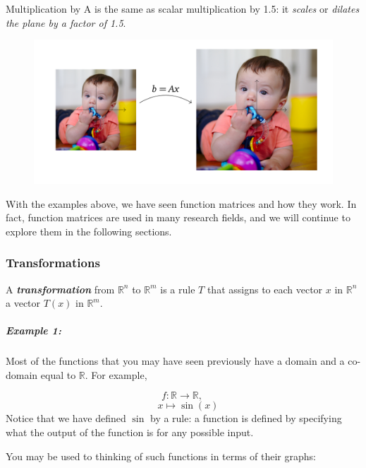 \documentclass[a4paper,12pt]{article}
\begin{document}
Multiplication by A is the same as scalar multiplication by 1.5: it \textit{scales} or \textit{dilates the plane by a factor of 1.5}.
\begin{figure}[H]
    \centering
    \includegraphics[width=1\linewidth]{1.5.png}
    \label{fig:enter-label}
\end{figure}

With the examples above, we have seen function matrices and how they work. In fact, function matrices are used in many research fields, and we will continue to explore them in the following sections. 

\subsubsection{Transformations}

\begin{tcolorbox}[title=Definition,colframe=blue!70!black, colback=blue!5!white]
A \textbf{\textit{transformation}} from \(\mathbb{R}^n\) to \(\mathbb{R}^m\) is a rule $T$ that assigns to each vector $x$ in \(\mathbb{R}^n\) a vector $T(x)$ in \(\mathbb{R}^m\). 
\end{tcolorbox}

\subparagraph{Example 1:}Most of the functions that you may have seen previously have a domain and a co-domain equal to
$\mathbb{R}$. For example,

\[
f: \mathbb{R} \to \mathbb{R}, \
\]
\[
\quad x \longmapsto \sin(x)
\]
Notice that we have defined $\sin$ by a rule: a function is defined by specifying what the output of the function is for any possible input.

You may be used to thinking of such functions in terms of their graphs:
\begin{center}
\end{center}
\end{document}
